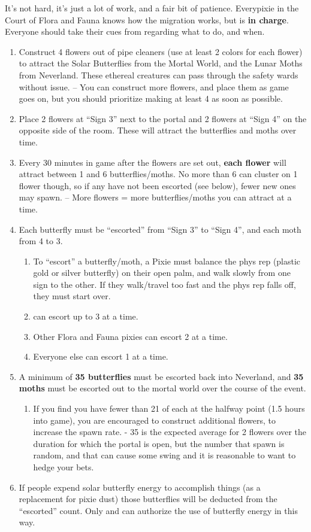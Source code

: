 \documentclass[green]{PP}
\begin{document}
\name{\gButterfly{}}

It’s not hard, it’s just a lot of work, and a fair bit of patience. Everypixie in the Court of Flora and Fauna knows how the migration works, but \cFButterfly{} is \textbf{in charge}. Everyone should take their cues from \cFButterfly{\them} regarding what to do, and when.

\begin{enumerate}
	\item Construct 4 flowers out of pipe cleaners (use at least 2 colors for each flower) to attract the Solar Butterflies from the Mortal World, and the Lunar Moths from Neverland. These ethereal creatures can pass through the safety wards without issue. -- You can construct more flowers, and place them as game goes on, but you should prioritize making at least 4 as soon as possible.
	\item Place 2 flowers at “Sign 3” next to the portal and 2 flowers at “Sign 4” on the opposite side of the room. These will attract the butterflies and moths over time.
	\item Every 30 minutes in game after the flowers are set out, \textbf{each flower} will attract between 1 and 6 butterflies/moths. No more than 6 can cluster on 1 flower though, so if any have not been escorted (see below), fewer new ones may spawn. -- More flowers = more butterflies/moths you can attract at a time.
	\item Each butterfly must be “escorted” from “Sign 3” to “Sign 4”, and each moth from 4 to 3.
	\begin{enumerate}
		\item To “escort” a butterfly/moth, a Pixie must balance the phys rep (plastic gold or silver butterfly) on their open palm, and walk slowly from one sign to the other. If they walk/travel too fast and the phys rep falls off, they must start over.
		\item \cFButterfly{} can escort up to 3 at a time.
		\item Other Flora and Fauna pixies can escort 2 at a time.
		\item Everyone else can escort 1 at a time.
	\end{enumerate}
	\item A minimum of \textbf{35 butterflies }must be escorted back into Neverland, and \textbf{35 moths }must be escorted out to the mortal world over the course of the event.
		\begin{enumerate}
		\item If you find you have fewer than 21 of each at the halfway point (1.5 hours into game), you are encouraged to construct additional flowers, to increase the spawn rate. - 35 is the expected average for 2 flowers over the duration for which the portal is open, but the number that spawn is random, and that can cause some swing and it is reasonable to want to hedge your bets.
	\end{enumerate}
	\item If people expend solar butterfly energy to accomplish things (as a replacement for pixie dust) those butterflies will be deducted from the “escorted” count. Only \cFButterfly{} and \cFHead{} can authorize the use of butterfly energy in this way. 
\end{enumerate}
\end{document}
